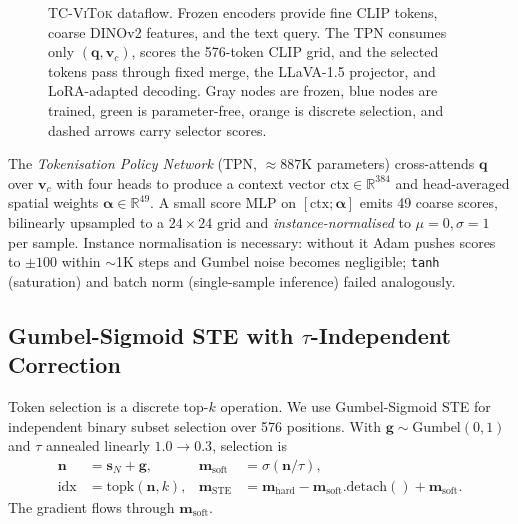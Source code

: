 \documentclass[runningheads]{llncs}
\newcommand{\vcoarse}{\mathbf{v}_{c}}
\newcommand{\qemb}{\mathbf{q}}
\newcommand{\sN}{\mathbf{s}_N}
\begin{document}
\begin{figure}[t]
{%
}
\caption{\textsc{TC-ViTok} dataflow. Frozen encoders provide fine
CLIP tokens, coarse DINOv2 features, and the text query. The TPN
consumes only $(\qemb,\vcoarse)$, scores the 576-token CLIP grid, and
the selected tokens pass through fixed merge, the LLaVA-1.5 projector,
and LoRA-adapted decoding. Gray nodes are frozen, blue nodes are
trained, green is parameter-free, orange is discrete selection, and
dashed arrows carry selector scores.}
\label{fig:architecture}
\end{figure}

The \emph{Tokenisation Policy Network} (TPN, ${\approx}887$K parameters)
cross-attends $\qemb$ over $\vcoarse$ with four heads to produce a context vector $\mathrm{ctx}\!\in\!\mathbb{R}^{384}$
and head-averaged spatial weights
$\boldsymbol{\alpha}\!\in\!\mathbb{R}^{49}$. A small score MLP on
$[\mathrm{ctx};\boldsymbol{\alpha}]$ emits 49 coarse scores, bilinearly
upsampled to a $24{\times}24$ grid and \emph{instance-normalised} to
$\mu{=}0,\sigma{=}1$ per sample. Instance normalisation is necessary:
without it Adam pushes scores to ${\pm}100$ within $\sim$1K steps and
Gumbel noise becomes negligible; \texttt{tanh} (saturation) and batch
norm (single-sample inference) failed analogously.

\subsection{Gumbel-Sigmoid STE with \texorpdfstring{$\tau$}{tau}-Independent Correction}
\label{sec:ste}

Token selection is a discrete top-$k$ operation. We use Gumbel-Sigmoid
STE for independent binary subset selection over 576 positions. With
$\mathbf{g}\!\sim\!\mathrm{Gumbel}(0,1)$ and $\tau$ annealed linearly
$1.0\!\to\!0.3$, selection is
\begin{equation}
\begin{aligned}
\mathbf{n} &= \sN + \mathbf{g}, &
\mathbf{m}_{\mathrm{soft}} &= \sigma(\mathbf{n}/\tau),\\
\mathrm{idx} &= \mathrm{topk}(\mathbf{n}, k), &
\mathbf{m}_{\mathrm{STE}} &=
\mathbf{m}_{\mathrm{hard}}
- \mathbf{m}_{\mathrm{soft}}.\mathrm{detach}()
+ \mathbf{m}_{\mathrm{soft}} .
\end{aligned}
\label{eq:gumbel-ste}
\end{equation}
The gradient flows through $\mathbf{m}_{\mathrm{soft}}$.
\end{document}
